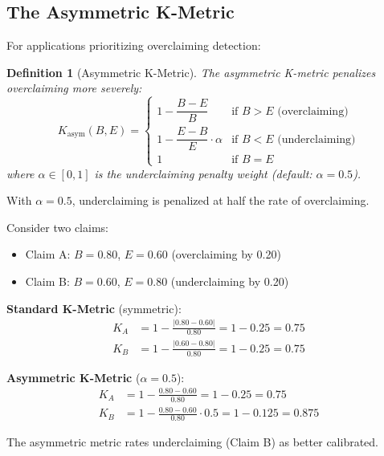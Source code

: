 \documentclass[11pt,a4paper]{article}
\newtheorem{definition}{Definition}[section]
\theoremstyle{remark}
\begin{document}
\subsection{The Asymmetric K-Metric}

For applications prioritizing overclaiming detection:

\begin{definition}[Asymmetric K-Metric]
\label{def:k-asymmetric}
The asymmetric K-metric penalizes overclaiming more severely:
\begin{equation}
K_{\text{asym}}(B, E) =
\begin{cases}
1 - \dfrac{B - E}{B} & \text{if } B > E \text{ (overclaiming)} \\[1em]
1 - \dfrac{E - B}{E} \cdot \alpha & \text{if } B < E \text{ (underclaiming)} \\[0.5em]
1 & \text{if } B = E
\end{cases}
\end{equation}
where $\alpha \in [0, 1]$ is the underclaiming penalty weight (default: $\alpha = 0.5$).
\end{definition}

With $\alpha = 0.5$, underclaiming is penalized at half the rate of overclaiming.

\begin{examplebox}[title={Symmetric vs. Asymmetric K-Metric}]
Consider two claims:
\begin{itemize}
    \item Claim A: $B = 0.80$, $E = 0.60$ (overclaiming by 0.20)
    \item Claim B: $B = 0.60$, $E = 0.80$ (underclaiming by 0.20)
\end{itemize}

\textbf{Standard K-Metric} (symmetric):
\begin{align}
K_A &= 1 - \frac{|0.80 - 0.60|}{0.80} = 1 - 0.25 = 0.75 \\
K_B &= 1 - \frac{|0.60 - 0.80|}{0.80} = 1 - 0.25 = 0.75
\end{align}

\textbf{Asymmetric K-Metric} ($\alpha = 0.5$):
\begin{align}
K_A &= 1 - \frac{0.80 - 0.60}{0.80} = 1 - 0.25 = 0.75 \\
K_B &= 1 - \frac{0.80 - 0.60}{0.80} \cdot 0.5 = 1 - 0.125 = 0.875
\end{align}

The asymmetric metric rates underclaiming (Claim B) as better calibrated.
\end{examplebox}
\end{document}
